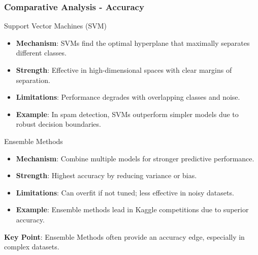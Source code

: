 \documentclass[aspectratio=169]{beamer}
\begin{document}
\begin{frame}
    \frametitle{Comparative Analysis - Accuracy}
    \begin{block}{Support Vector Machines (SVM)}
        \begin{itemize}
            \item \textbf{Mechanism}: SVMs find the optimal hyperplane that maximally separates different classes.
            \item \textbf{Strength}: Effective in high-dimensional spaces with clear margins of separation.
            \item \textbf{Limitations}: Performance degrades with overlapping classes and noise.
            \item \textbf{Example}: In spam detection, SVMs outperform simpler models due to robust decision boundaries.
        \end{itemize}
    \end{block}

    \begin{block}{Ensemble Methods}
        \begin{itemize}
            \item \textbf{Mechanism}: Combine multiple models for stronger predictive performance.
            \item \textbf{Strength}: Highest accuracy by reducing variance or bias.
            \item \textbf{Limitations}: Can overfit if not tuned; less effective in noisy datasets.
            \item \textbf{Example}: Ensemble methods lead in Kaggle competitions due to superior accuracy.
        \end{itemize}
    \end{block}
    
    \textbf{Key Point}: Ensemble Methods often provide an accuracy edge, especially in complex datasets.
\end{frame}
\end{document}
